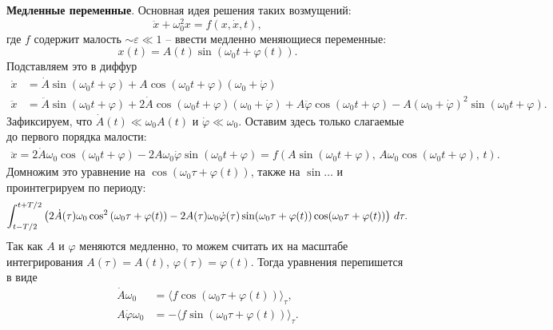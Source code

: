 \textbf{Медленные переменные}. 
Основная идея решения таких возмущений:
\begin{equation*}
    \ddot{x} + \omega_0^2 x = f(x, \dot{x}, t),
\end{equation*}
где $f$ содержит малость $\sim \varepsilon \ll 1$ -- ввести медленно меняющиеся переменные:
\begin{equation*}
    x(t) = A(t) \sin (\omega_0 t + \varphi(t)).
\end{equation*}
Подставляем это в диффур
\begin{align*}
    \dot{x} &= \dot{A} \sin(\omega_0 t + \varphi) + A \cos (\omega_0 t + \varphi) (\omega_0 + \dot{\varphi}) \\
    \ddot{x} &= \ddot{A} \sin (\omega_0 t + \varphi) + 2 \dot{A} \cos(\omega_0 t + \varphi) (\omega_0 + \dot{\varphi}) + A \ddot{\varphi} \cos(\omega_0  t + \varphi) - A (\omega_0 + \dot{\varphi})^2 \sin(\omega_0 t + \varphi).
\end{align*}
Зафиксируем, что $\dot{A} (t) \ll \omega_0 A(t)$ и $\dot{\varphi} \ll \omega_0$. Оставим здесь только слагаемые до первого порядка малости:
\begin{align*}
    \ddot{x} = 2 \dot{A} \omega_0 \cos(\omega_0 t + \varphi)  - 2 A \omega_0 \dot{\varphi} \sin(\omega_0 t + \varphi) = 
    f\left(
        A \sin(\omega_0 t + \varphi),\, A \omega_0 \cos (\omega_0 t + \varphi),\, t
    \right).
\end{align*}
Домножим это уравнение на $\cos(\omega_0 \tau + \varphi(t))$, также на $\sin \ldots$ и проинтегрируем по периоду:
\begin{equation*}
    \int_{t-T/2}^{t+T/2} \left(
        2 \dot{A}(\tau) \omega_0 \cos^2 \left(\omega_0 \tau + \varphi(t)\right) - 2 A(\tau) \omega_0 \dot{\varphi} (\tau) \sin(\omega_0 \tau + \varphi(t)) \cos(\omega_0 \tau + \varphi(t))
    \right) \, d \tau.
\end{equation*}
Так как $A$ и $\varphi$ меняются медленно, то можем считать их на масштабе интегрирования $A(\tau) = A(t)$, $\varphi(\tau) = \varphi(t)$. 
Тогда уравнения перепишется в виде
\begin{align}
    \dot{A} \omega_0 &= \langle f \cos(\omega_0 \tau + \varphi(t))\rangle_\tau, \\
    A \dot{\varphi} \omega_0 &= - \langle f \sin\left(\omega_0 \tau + \varphi(t)\right)\rangle_\tau.
\end{align}


